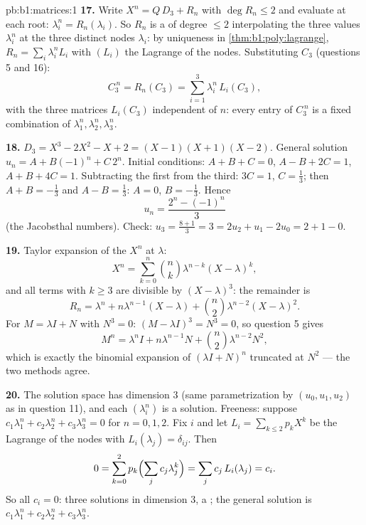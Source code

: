 \begin{solution}{pb:b1:matrices:1}
\textbf{17.} Write $X^n = Q\,D_3 + R_n$ with $\deg R_n \leq 2$
and evaluate at each root: $\lambda_i^n = R_n(\lambda_i)$. So
$R_n$ is a  of degree $\leq 2$ interpolating the three
values $\lambda_i^n$ at the three distinct nodes $\lambda_i$: by
uniqueness in \cref{thm:b1:poly:lagrange}, $R_n = \sum_i
\lambda_i^n L_i$ with $(L_i)$ the Lagrange  of the nodes.
Substituting $C_3$ (questions 5 and 16):
\[
C_3^{\,n} = R_n(C_3) = \sum_{i=1}^{3} \lambda_i^n\,L_i(C_3),
\]
with the three matrices $L_i(C_3)$ independent of $n$: every
entry of $C_3^{\,n}$ is a fixed combination of $\lambda_1^n,
\lambda_2^n, \lambda_3^n$.

\textbf{18.} $D_3 = X^3 - 2X^2 - X + 2 = (X-1)(X+1)(X-2)$.
General solution $u_n = A + B(-1)^n + C\,2^n$. Initial
conditions: $A + B + C = 0$, $A - B + 2C = 1$, $A + B + 4C = 1$.
Subtracting the first from the third: $3C = 1$, $C = \frac13$;
then $A + B = -\frac13$ and $A - B = \frac13$: $A = 0$, $B =
-\frac13$. Hence
\[
u_n = \frac{2^n - (-1)^n}{3}
\]
(the Jacobsthal numbers). Check: $u_3 = \frac{8 + 1}{3} = 3 =
2u_2 + u_1 - 2u_0 = 2 + 1 - 0$.

\textbf{19.} Taylor expansion of the  $X^n$ at
$\lambda$:
\[
X^n = \sum_{k=0}^{n} \binom nk \lambda^{n-k}(X - \lambda)^k ,
\]
and all terms with $k \geq 3$ are divisible by $(X -
\lambda)^3$: the remainder is
\[
R_n = \lambda^n + n\lambda^{n-1}(X - \lambda) + \binom
n2\lambda^{n-2}(X - \lambda)^2 .
\]
For $M = \lambda I + N$ with $N^3 = 0$: $(M - \lambda I)^3 = N^3
= 0$, so question 5 gives
\[
M^n = \lambda^n I + n\lambda^{n-1} N + \binom n2
\lambda^{n-2} N^2 ,
\]
which is exactly the binomial expansion of $(\lambda I + N)^n$
truncated at $N^2$ --- the two methods agree.

\textbf{20.} The solution space has dimension $3$ (same
parametrization by $(u_0, u_1, u_2)$ as in question 11), and
each $(\lambda_i^n)$ is a solution. Freeness: suppose
$c_1\lambda_1^n + c_2\lambda_2^n + c_3\lambda_3^n = 0$ for $n =
0, 1, 2$. Fix $i$ and let $L_i = \sum_{k \leq 2} p_k X^k$ be the
Lagrange  of the nodes with $L_i(\lambda_j) =
\delta_{ij}$. Then
\[
0 = \sum_{k=0}^{2} p_k\Bigl(\sum_j c_j\lambda_j^k\Bigr)
= \sum_j c_j\,L_i(\lambda_j) = c_i .
\]
So all $c_i = 0$: three  solutions in dimension $3$, a
; the general solution is $c_1\lambda_1^n +
c_2\lambda_2^n + c_3\lambda_3^n$.


\end{solution}

